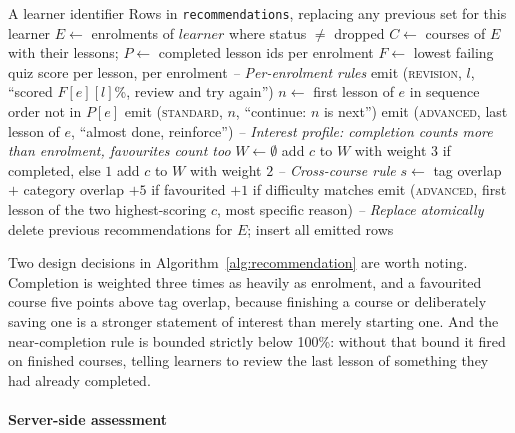 \documentclass[12pt, oneside]{article} %
\begin{document}
\begin{algorithm}[H]
\caption{generateRecommendations($learner$)}
\label{alg:recommendation}
\begin{algorithmic}[1]
\Require A learner identifier
\Ensure Rows in \texttt{recommendations}, replacing any previous set for this learner
\State $E \gets$ enrolments of $learner$ where status $\neq$ dropped
 \State \Return \EndIf
\State $C \gets$ courses of $E$ with their lessons; $P \gets$ completed lesson ids per enrolment
\State $F \gets$ lowest failing quiz score per lesson, per enrolment
\Statex \textit{-- Per-enrolment rules}
    \State emit (\textsc{revision}, $l$, ``scored $F[e][l]$\%, review and try again'')
  \EndFor
  \State $n \gets$ first lesson of $e$ in sequence order not in $P[e]$
    \State emit (\textsc{standard}, $n$, ``continue: $n$ is next'')
  \EndIf
    \State emit (\textsc{advanced}, last lesson of $e$, ``almost done, reinforce'')
  \EndIf
\EndFor
\Statex \textit{-- Interest profile: completion counts more than enrolment, favourites count too}
\State $W \gets \emptyset$ 
 \State add $c$ to $W$ with weight $3$ if completed, else $1$ \EndFor
{} \State add $c$ to $W$ with weight $2$ \EndFor
\Statex \textit{-- Cross-course rule}
  \State $s \gets$ tag overlap $+$ category overlap $+ 5$ if favourited $+ 1$ if difficulty matches
\EndFor
\State emit (\textsc{advanced}, first lesson of the two highest-scoring $c$, most specific reason)
\Statex \textit{-- Replace atomically}
\State delete previous recommendations for $E$; insert all emitted rows
\end{algorithmic}
\end{algorithm}

Two design decisions in Algorithm~\ref{alg:recommendation} are worth noting. Completion is weighted three times as heavily as enrolment, and a favourited course five points above tag overlap, because finishing a course or deliberately saving one is a stronger statement of interest than merely starting one. And the near-completion rule is bounded strictly below 100\%: without that bound it fired on finished courses, telling learners to review the last lesson of something they had already completed.

\paragraph{Server-side assessment}
\end{document}
